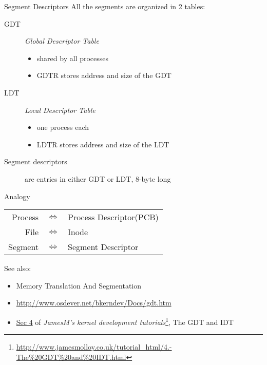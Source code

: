 \begin{frame}{Segment Descriptors}
    All the segments are organized in 2 tables:
    \begin{description}
    \item[GDT] \emph{Global Descriptor Table}
      \begin{itemize}
      \item shared by all processes
      \item GDTR stores address and size of the GDT
      \end{itemize}
    \item[LDT] \emph{Local Descriptor Table}
      \begin{itemize}
      \item one process each
      \item LDTR stores address and size of the LDT
      \end{itemize}
    \item[Segment descriptors] are entries in either GDT or LDT, 8-byte long
    \end{description}
      \begin{block}{Analogy}
        \begin{center}
          \begin{tabular}{rcl}
            Process&$\Longleftrightarrow$&Process Descriptor(PCB)\\
            File&$\Longleftrightarrow$&Inode\\
            Segment&$\Longleftrightarrow$&Segment Descriptor
          \end{tabular}
        \end{center}
      \end{block}
\end{frame}

See also:
\begin{itemize}
\item Memory Translation And Segmentation 
\item \url{http://www.osdever.net/bkerndev/Docs/gdt.htm}
\item \href{http://www.jamesmolloy.co.uk/tutorial\_html/4.-The\%20GDT\%20and\%20IDT.html}{Sec 4} of \emph{JamesM's kernel development
    tutorials}\footnote{\url{http://www.jamesmolloy.co.uk/tutorial_html/4.-The\%20GDT\%20and\%20IDT.html}},
  The GDT and IDT
\end{itemize}


